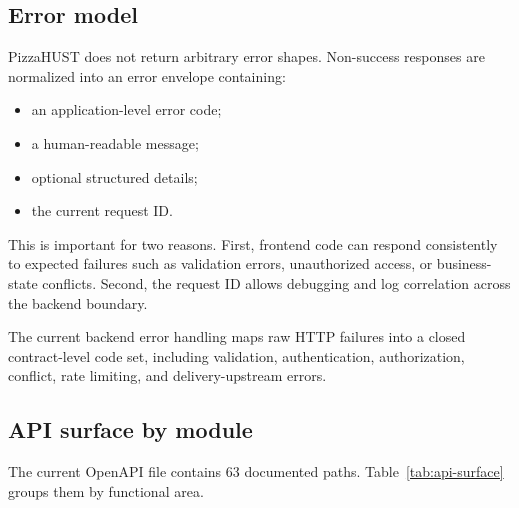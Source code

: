 \subsection{Error model}

PizzaHUST does not return arbitrary error shapes. Non-success responses are normalized into an error envelope containing:

\begin{itemize}
    \item an application-level error code;
    \item a human-readable message;
    \item optional structured details;
    \item the current request ID.
\end{itemize}

This is important for two reasons. First, frontend code can respond consistently to expected failures such as validation errors, unauthorized access, or business-state conflicts. Second, the request ID allows debugging and log correlation across the backend boundary.

The current backend error handling maps raw HTTP failures into a closed contract-level code set, including validation, authentication, authorization, conflict, rate limiting, and delivery-upstream errors.

\subsection{API surface by module}

The current OpenAPI file contains 63 documented paths. Table~\ref{tab:api-surface} groups them by functional area.

